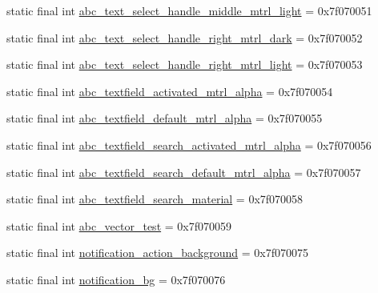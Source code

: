 \begin{DoxyCompactItemize}
\item 
static final int \mbox{\hyperlink{classandroid_1_1support_1_1v7_1_1appcompat_1_1_r_1_1drawable_afcedd039cec83d38f6f17910e1f37893}{abc\+\_\+text\+\_\+select\+\_\+handle\+\_\+middle\+\_\+mtrl\+\_\+light}} = 0x7f070051
\item 
static final int \mbox{\hyperlink{classandroid_1_1support_1_1v7_1_1appcompat_1_1_r_1_1drawable_a2f2b50c4199149da3511997382c7cb46}{abc\+\_\+text\+\_\+select\+\_\+handle\+\_\+right\+\_\+mtrl\+\_\+dark}} = 0x7f070052
\item 
static final int \mbox{\hyperlink{classandroid_1_1support_1_1v7_1_1appcompat_1_1_r_1_1drawable_a9571ee55f1f31cd4cdb2a5abab28b0a6}{abc\+\_\+text\+\_\+select\+\_\+handle\+\_\+right\+\_\+mtrl\+\_\+light}} = 0x7f070053
\item 
static final int \mbox{\hyperlink{classandroid_1_1support_1_1v7_1_1appcompat_1_1_r_1_1drawable_ae8bbef6c2b80b044a07e1d6780e06aff}{abc\+\_\+textfield\+\_\+activated\+\_\+mtrl\+\_\+alpha}} = 0x7f070054
\item 
static final int \mbox{\hyperlink{classandroid_1_1support_1_1v7_1_1appcompat_1_1_r_1_1drawable_a7c33f295eda00f089cb60a480e595b5e}{abc\+\_\+textfield\+\_\+default\+\_\+mtrl\+\_\+alpha}} = 0x7f070055
\item 
static final int \mbox{\hyperlink{classandroid_1_1support_1_1v7_1_1appcompat_1_1_r_1_1drawable_a00703e7605d149c1c96ba37e9a700fe0}{abc\+\_\+textfield\+\_\+search\+\_\+activated\+\_\+mtrl\+\_\+alpha}} = 0x7f070056
\item 
static final int \mbox{\hyperlink{classandroid_1_1support_1_1v7_1_1appcompat_1_1_r_1_1drawable_a7f879ca4144a7a5c7ce00c1365719a05}{abc\+\_\+textfield\+\_\+search\+\_\+default\+\_\+mtrl\+\_\+alpha}} = 0x7f070057
\item 
static final int \mbox{\hyperlink{classandroid_1_1support_1_1v7_1_1appcompat_1_1_r_1_1drawable_ab7f05c2630051bd2d1746ef890c755fa}{abc\+\_\+textfield\+\_\+search\+\_\+material}} = 0x7f070058
\item 
static final int \mbox{\hyperlink{classandroid_1_1support_1_1v7_1_1appcompat_1_1_r_1_1drawable_ac31c3e65556e850c56278ad4e637a344}{abc\+\_\+vector\+\_\+test}} = 0x7f070059
\item 
static final int \mbox{\hyperlink{classandroid_1_1support_1_1v7_1_1appcompat_1_1_r_1_1drawable_ab2de29fab5e00c453c246bb047928c54}{notification\+\_\+action\+\_\+background}} = 0x7f070075
\item 
static final int \mbox{\hyperlink{classandroid_1_1support_1_1v7_1_1appcompat_1_1_r_1_1drawable_aa779a928f01e080c4c632654e16b6d6a}{notification\+\_\+bg}} = 0x7f070076

\end{DoxyCompactItemize}
